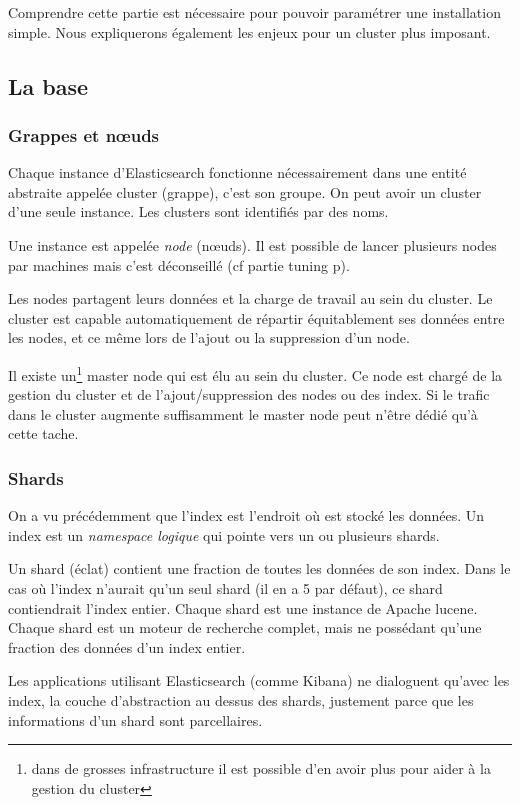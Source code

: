 {Comprendre cette partie est nécessaire pour pouvoir paramétrer une installation simple.
Nous expliquerons également les enjeux pour un cluster plus imposant.
\subsection{La base}
\label{subsec:labase}
\subsubsection{Grappes et nœuds}
Chaque instance d'Elasticsearch fonctionne nécessairement dans une entité abstraite 
appelée cluster (grappe), c'est son groupe. On peut avoir un cluster d'une seule instance.
Les clusters sont identifiés par des noms.

Une instance est appelée \emph{node} (nœuds). Il est possible de lancer plusieurs nodes  
par machines mais c'est déconseillé (cf partie tuning p\pageref{subsec:elastictuning}).

Les nodes partagent leurs données et la charge de travail au sein du cluster. Le 
cluster est capable automatiquement de répartir équitablement ses données entre 
les nodes, et ce même lors de l'ajout ou la suppression d'un node.

Il existe un\footnote{dans de grosses infrastructure il est possible d'en avoir plus
pour aider à la gestion du cluster} master node qui est élu au sein du cluster. 
Ce node est chargé de la gestion du cluster et de l'ajout/suppression des nodes ou des  
index. Si le trafic dans le cluster augmente suffisamment le master node peut n'être 
dédié qu'à cette tache.

\subsubsection{Shards}
On a vu précédemment que l'index est l'endroit où est stocké les données. Un 
index est un \textit{namespace logique} qui pointe vers un ou plusieurs shards.

Un shard (éclat) contient une fraction de toutes les données de  son index. Dans 
le cas où l'index n'aurait qu'un seul shard (il en a 5 par défaut), ce shard contiendrait
l'index entier.
Chaque shard est une instance de Apache lucene. Chaque shard est un moteur de recherche
complet, mais ne possédant qu'une fraction des données d'un index entier.

Les applications utilisant Elasticsearch (comme Kibana) ne dialoguent qu'avec les 
index, la couche d'abstraction au dessus des shards, justement parce que les informations 
d'un shard sont parcellaires.

}
